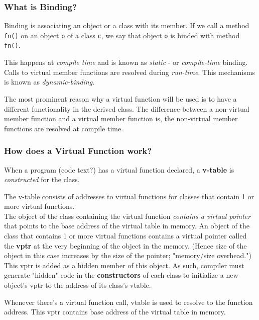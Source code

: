\documentclass[10pt]{amsart}
\begin{document}
\subsubsection{What is Binding?}  

Binding is associating an object or a class with its member.   If we call a method \verb|fn()| on an object \verb|o| of a class \verb|c|, we say that object \verb|o| is binded with method \verb|fn()|.  

This happens at \emph{compile time} and is known as \emph{static} - or \emph{compile-time} binding.   
Calls to virtual member functions are resolved during \emph{run-time}.  This mechanisms is known as \emph{dynamic-binding.}   

The most prominent reason why a virtual function will be used is to have a different functionality in the derived class.  The difference between a non-virtual member function and a virtual member function is, the non-virtual member functions are resolved at compile time.  


\subsubsection{How does a Virtual Function work?}  

When a program (code text?) has a virtual function declared, a \textbf{v-table} is \emph{constructed} for the class.  

The v-table consists of addresses to virtual functions for classes that contain 1 or more virtual functions.  \\
The object of the class containing the virtual function \emph{contains a virtual pointer} that points to the base address of the virtual table in memory.  An object of the class that contains 1 or more virtual functions contains a virtual pointer called the \textbf{vptr} at the very beginning of the object in the memory.  (Hence size of the object in this case increases by the size of the pointer; "memory/size overhead.")  \\

This vptr is added as a hidden member of this object.  As such, compiler must generate "hidden" code in the \textbf{constructors} of each class to initialize a new object's vptr to the address of its class's vtable.  


Whenever there's a virtual function call, vtable is used to resolve to the function address.  
This vptr contains base address of the virtual table in memory.  \\
\end{document}
